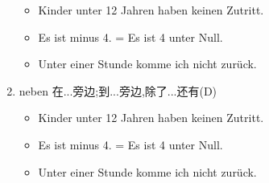 \documentclass[12pt,A4paper,oneside,reqno]{amsart}
\numberwithin{equation}{section}
\theoremstyle{plain}
\theoremstyle{plain}
\theoremstyle{plain}
\numberwithin{equation}{section}
\theoremstyle{remark}
\begin{document}
\begin{enumerate}[1.]
	\renewcommand\labelitemi{\normalfont\bfseries \textendash}
	\begin{itemize}
		\item Kinder unter 12 Jahren haben keinen Zutritt.
		\item Es ist minus 4. = Es ist 4 unter Null.
		\item Unter einer Stunde komme ich nicht zur\"{u}ck.
	\end{itemize}
		\item neben 在...旁边;到...旁边,除了...还有(D)
\renewcommand\labelitemi{\normalfont\bfseries \textendash}
\begin{itemize}
	\item Kinder unter 12 Jahren haben keinen Zutritt.
	\item Es ist minus 4. = Es ist 4 unter Null.
	\item Unter einer Stunde komme ich nicht zur\"{u}ck.
\end{itemize}
\end{enumerate}
\end{document}

